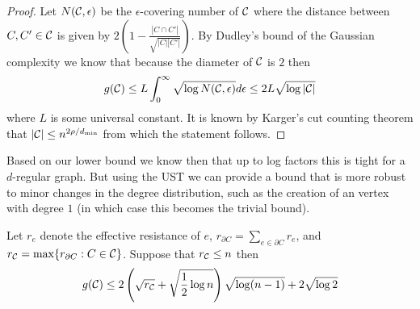 \begin{proof}
Let $N(\mathcal{C},\epsilon)$ be the $\epsilon$-covering number of $\mathcal{C}$ where the distance between $C,C' \in \mathcal{C}$ is given by $2(1 - \frac{|C \cap C'|}{\sqrt{|C||C'|}})$.
By Dudley's bound of the Gaussian complexity we know that because the diameter of $\mathcal{C}$ is $2$ then
\[
g(\mathcal{C}) \le L \int_0^\infty \sqrt{\log N(\mathcal{C},\epsilon)} d\epsilon \le 2 L \sqrt{\log |\mathcal{C}|}
\]
where $L$ is some universal constant.
It is known by Karger's cut counting theorem that $|\mathcal{C}| \le n^{2\rho/d_{\min}}$ from which the statement follows.
\end{proof}

Based on our lower bound we know then that up to log factors this is tight for a $d$-regular graph.
But using the UST we can provide a bound that is more robust to minor changes in the degree distribution, such as the creation of an vertex with degree $1$ (in which case this becomes the trivial bound).

\begin{theorem}

Let $r_e$ denote the effective resistance of $e$, $r_{\partial C} = \sum_{e \in \partial C} r_e$, and $r_{\mathcal{C}} = \max \{ r_{\partial C} : C \in \mathcal{C} \}$.
Suppose that $r_{\mathcal{C}} \le n$ then
\[
g(\mathcal{C}) \le 2 \left(\sqrt{r_{\mathcal{C}}} + \sqrt{\frac{1}{2} \log n}\right)\sqrt{\log (n-1)} + 2 \sqrt{\log 2}
\]

\end{theorem}

